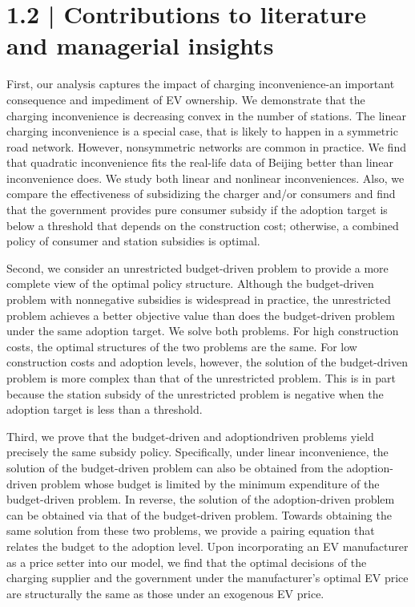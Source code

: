 \documentclass[10pt]{article}
\begin{document}
\section*{1.2 | Contributions to literature and managerial insights}
First, our analysis captures the impact of charging inconvenience-an important consequence and impediment of EV ownership. We demonstrate that the charging inconvenience is decreasing convex in the number of stations. The linear charging inconvenience is a special case, that is likely to happen in a symmetric road network. However, nonsymmetric networks are common in practice. We find that quadratic inconvenience fits the real-life data of Beijing better than linear inconvenience does. We study both linear and nonlinear inconveniences. Also, we compare the effectiveness of subsidizing the charger and/or consumers and find that the government provides pure consumer subsidy if the adoption target is below a threshold that depends on the construction cost; otherwise, a combined policy of consumer and station subsidies is optimal.

Second, we consider an unrestricted budget-driven problem to provide a more complete view of the optimal policy structure. Although the budget-driven problem with nonnegative subsidies is widespread in practice, the unrestricted problem achieves a better objective value than does the budget-driven problem under the same adoption target. We solve both problems. For high construction costs, the optimal structures of the two problems are the same. For low construction costs and adoption levels, however, the solution of the budget-driven problem is more complex than that of the unrestricted problem. This is in part because the station subsidy of the unrestricted problem is negative when the adoption target is less than a threshold.

Third, we prove that the budget-driven and adoptiondriven problems yield precisely the same subsidy policy. Specifically, under linear inconvenience, the solution of the budget-driven problem can also be obtained from the adoption-driven problem whose budget is limited by the minimum expenditure of the budget-driven problem. In reverse, the solution of the adoption-driven problem can be obtained via that of the budget-driven problem. Towards obtaining the same solution from these two problems, we provide a pairing equation that relates the budget to the adoption level. Upon incorporating an EV manufacturer as a price setter into our model, we find that the optimal decisions of the charging supplier and the government under the manufacturer's optimal EV price are structurally the same as those under an exogenous EV price.
\end{document}
